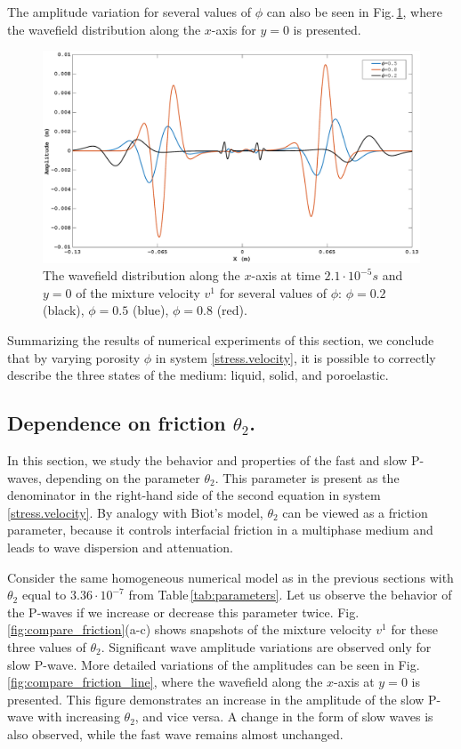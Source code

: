 \documentclass[3p,times,table]{article}
\begin{document}
 The amplitude variation  for several values of $\phi$ can also be 
 seen in Fig.\,\ref{fig:porosity different}, where the wavefield distribution along the 
 $x$-axis for $y=0$ is presented. 
 \begin{figure}[!htbp]
	\begin{center}
		\includegraphics[draft=false,width=1.0\textwidth]{Figures/Compare_alfa}
	\end{center}
\caption{The wavefield distribution along the $x$-axis  at  
time $2.1\cdot10^{-5}s$ and $y=0$ of the mixture velocity $v^1$ for several values of 
$\phi$: $\phi=0.2$ (black), $\phi=0.5$ (blue), $\phi=0.8$ 
(red).}
\label{fig:porosity different}
\end{figure}

Summarizing  the results of numerical experiments of this section, we conclude that 
by varying porosity $\phi$ in system \eqref{stress.velocity}, it is 
possible to correctly describe the three states of the medium: liquid, solid, and 
poroelastic.

\subsection{Dependence on friction $ \theta_2 $.}

In this section, we study the behavior and properties of the fast and slow 
P-waves, depending on the parameter $\theta_2$. This parameter is present as 
the denominator in the right-hand side of the second equation in system 
\eqref{stress.velocity}. By analogy with Biot's model, $\theta_2$ can be 
viewed as a friction parameter, because it controls interfacial friction 
in a multiphase medium and leads to  wave dispersion and attenuation.

Consider the same homogeneous numerical model as in the previous sections with 
$ \theta_2$ equal to $3.36\cdot10^{-7}$ from Table\,\ref{tab:parameters}. Let 
us observe the behavior of the  P-waves if we increase or decrease 
this parameter twice. Fig.\,\ref{fig:compare_friction}(a-c) shows snapshots of 
the mixture velocity $v^1$ for these three values of $ \theta_2$. 
Significant wave amplitude variations are observed only for slow P-wave. More 
detailed variations of the amplitudes can be seen in 
Fig.\,\ref{fig:compare_friction_line}, where the wavefield along the 
$x$-axis 
at $y=0$ is presented. This figure demonstrates an increase in 
the 
amplitude of  the slow P-wave with increasing $\theta_2$, 
and vice versa. A change in the form of slow waves is also observed, while 
the fast wave remains almost unchanged.
\end{document}
